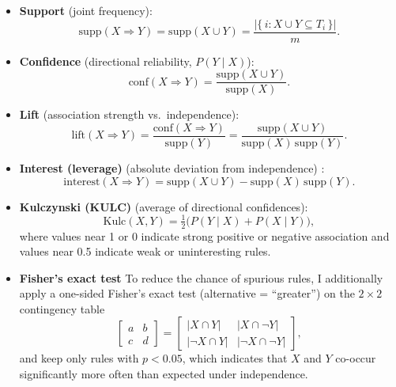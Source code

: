 \documentclass{article}  %
\begin{document}
\begin{itemize}
    \item \textbf{Support} (joint frequency):
    \[
    \mathrm{supp}(X \Rightarrow Y)
    = \mathrm{supp}(X \cup Y)
    = \frac{\bigl|\{\,i : X \cup Y \subseteq T_{i}\,\}\bigr|}{m}.
    \]

    \item \textbf{Confidence} (directional reliability, \(P(Y \mid X)\)):
    \[
    \mathrm{conf}(X \Rightarrow Y)
    = \frac{\mathrm{supp}(X \cup Y)}{\mathrm{supp}(X)}.
    \]

    \item \textbf{Lift} (association strength vs.\ independence):
    \[
    \mathrm{lift}(X \Rightarrow Y)
    = \frac{\mathrm{conf}(X \Rightarrow Y)}{\mathrm{supp}(Y)}
    = \frac{\mathrm{supp}(X \cup Y)}
           {\mathrm{supp}(X)\,\mathrm{supp}(Y)}.
    \]

    \item \textbf{Interest (leverage)} (absolute deviation from independence) \parencite{InterestMeasureCalculateAdditional}:
    \[
    \mathrm{interest}(X \Rightarrow Y)
    = \mathrm{supp}(X \cup Y)
    - \mathrm{supp}(X)\,\mathrm{supp}(Y).
    \]

    \item \textbf{Kulczynski (KULC)} (average of directional confidences):
    \[
    \mathrm{Kulc}(X, Y)
    = \tfrac{1}{2}\bigl(P(Y \mid X) + P(X \mid Y)\bigr),
    \]
where values near 1 or 0 indicate strong positive or negative association and values near 0.5 indicate weak or uninteresting rules.

    \item \textbf{Fisher's exact test} \parencite{StatisticalNotesClinical}
 To reduce the chance of spurious rules, I additionally apply a one-sided
Fisher's exact test (alternative = ``greater'') on the \(2 \times 2\)
contingency table
\[
\begin{bmatrix}
a & b \\
c & d
\end{bmatrix}
=
\begin{bmatrix}
|X \cap Y|      & |X \cap \lnot Y| \\
|\lnot X \cap Y| & |\lnot X \cap \lnot Y|
\end{bmatrix},
\]
and keep only rules with \(p < 0.05\), which indicates that \(X\) and \(Y\)
co-occur significantly more often than expected under independence.

\end{itemize}
\end{document}
